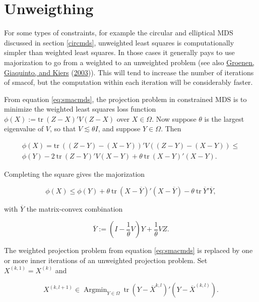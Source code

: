 \documentclass[
  12pt,
]{book}
\theoremstyle{definition}
\theoremstyle{definition}
\theoremstyle{definition}
\theoremstyle{definition}
\theoremstyle{remark}
\begin{document}
\hypertarget{majawa}{%
\section{Unweigthing}\label{majawa}}

For some types of constraints, for example the circular and elliptical MDS discussed in section \ref{circmds}, unweighted least squares is computationally simpler than weighted least squares. In those cases it generally pays to use majorization to go from a weighted to an unweighted problem (see also \protect\hyperlink{ref-groenen_giaquinto_kiers_03}{Groenen, Giaquinto, and Kiers} (\protect\hyperlink{ref-groenen_giaquinto_kiers_03}{2003})). This will tend to increase the number of iterations of smacof, but the computation within each iteration will be considerably faster.

From equation \eqref{eq:smacmds}, the projection problem in constrained MDS is to minimize the weighted least squares loss function \(\phi(X):=\text{tr}\ (Z-X)'V(Z-X)\) over \(X\in\Omega\). Now suppose \(\theta\) is the largest eigenvalue of \(V\), so that
\(V\lesssim\theta I\), and suppose \(Y\in\Omega\). Then

\begin{multline}
\phi(X)=\text{tr}\ ((Z-Y)-(X-Y))'V((Z-Y)-(X-Y))\leq\\\phi(Y)-2\ \text{tr}\ (Z-Y)'V(X-Y)+\theta\ \text{tr}\ (X-Y)'(X-Y).
\label{eq:majproj}
\end{multline}

Completing the square gives the majorization

\begin{equation}
\phi(X)\leq\phi(Y)+\theta\ \text{tr}\ (X-\overline{Y})'(X-\overline{Y})-\theta\ \text{tr}\ \overline{Y}'\overline{Y},
\label{eq:compsqproj}
\end{equation}

with \(\overline{Y}\) the matrix-convex combination

\begin{equation}
\overline{Y}:=(I-\frac{1}{\theta}V)Y+\frac{1}{\theta}VZ.
\label{eq:projtarget}
\end{equation}

The weighted projection problem from equation \eqref{eq:smacmds} is replaced by one or more inner iterations of an unweighted projection problem. Set \(X^{(k,1)}=X^{(k)}\) and

\begin{equation}
X^{(k,l+1)}\in\mathop{\text{Argmin}}_{Y\in\Omega}\ \text{tr}\ (Y-\overline{X}^{k,l})'(Y-\overline{X}^{(k,l)}).
\label{eq:smaprojinner}
\end{equation}
\end{document}
